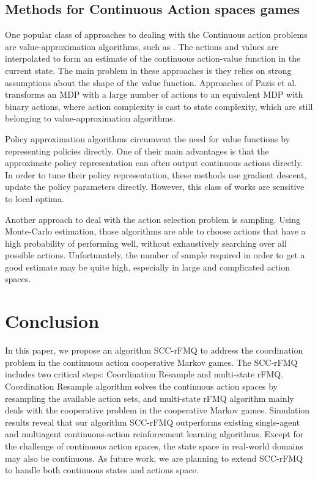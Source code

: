 \documentclass[journal,transmag]{IEEEtran}
\begin{document}
\subsection{Methods for Continuous Action spaces games}


One popular class of approaches to dealing with the Continuous action problems are value-approximation algorithms, such as \cite{Sutton2009FGM,lillicrap2015continuous}. The actions and values are interpolated to form an estimate of the continuous action-value function in the current state. The main problem in these approaches is they relies on strong assumptions about the shape of the value function. Approaches of Pazis et al. \cite{Pazis2009BAS,pazis2011Learning,Pazis2011Generalized} transforms an MDP with a large number of actions to an equivalent MDP with binary actions, where action complexity is cast to state complexity, which are still belonging to value-approximation algorithms.

Policy approximation algorithms \cite{KONDA2003,Thathachar2004Networks,Peters2008SIR} circumvent the need for value functions by representing policies directly. One of their main advantages is that the approximate policy representation can often output continuous actions directly. In order to tune their policy representation, these methods use gradient descent, update the policy parameters directly. However, this class of works are sensitive to local optima.

Another approach to deal with the action selection problem is sampling\cite{Sallans2004RLF,Lazaric2007Reinforcement}. Using Monte-Carlo estimation, those algorithms are able to choose actions that have a high probability of performing well, without exhaustively searching over all possible actions. Unfortunately, the number of sample required in order to get a good estimate may be quite high, especially in large and complicated action spaces.


\section{Conclusion}

In this paper, we propose an algorithm SCC-rFMQ to address the coordination problem in the continuous action cooperative Markov games. The SCC-rFMQ includes two critical steps: Coordination Resample and multi-state rFMQ. Coordination Resample algorithm solves the continuous action spaces by resampling the available action sets, and multi-state rFMQ algorithm mainly deals with the cooperative problem in the cooperative Markov games. Simulation results reveal that our algorithm SCC-rFMQ outperforms existing single-agent and multiagent continuous-action reinforcement learning algorithms. Except for the challenge of continuous action spaces, the state space in real-world domains may also be continuous. As future work, we are planning to extend SCC-rFMQ to handle both continuous states and actions space.%
\end{document}
